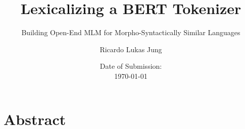 \documentclass[12pt, a4paper, english]{ttlab-qualify}
\begin{document}
    \titlehead{
        Ricardo Lukas Jung\\
        6227492\\
        Empirische Sprachwissenschaft (B.A.)\\
        Phonetik \& Digital Humanities \\
        15\textsuperscript{th} Semester\\
        s2458588@stud.uni-frankfurt.de
    }
    \subject{Bachelor Thesis}
    \author{Ricardo Lukas Jung}
    \title{Lexicalizing a BERT Tokenizer}
    \subtitle{Building Open-End MLM for Morpho-Syntactically Similar Languages}
    \date{Date of Submission: \\\today}
    \publishers{Text Technology Lab\\Prof. Dr. Alexander Mehler\\Dr. Zakharia Pourtskhvanidze}

    \maketitle

    \cleardoublepage
    \addtocounter{page}{-1}
    \thispagestyle{empty}

    \chapter*{Abstract}
    \thispagestyle{empty}
    



    \cleardoubleoddpage
    \setcounter{page}{0}
    \tableofcontents
    \newpage
    \listoffigures
    \newpage
    \listoftables
    \newpage

\end{document}
